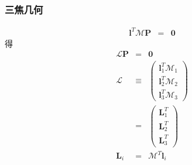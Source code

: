 \documentclass{beamer}
\newcommand{\tmmathbf}[1]{\ensuremath{\boldsymbol{#1}}}
\begin{document}
{{\begin{frame}
  {\hspace{4em}}
\end{frame}}{\begin{frame}
  \frametitle{三焦几何}
  \begin{eqnarray*}
    \tmmathbf{l}^T \mathcal{M}\tmmathbf{P} & = & \tmmathbf{0}
  \end{eqnarray*}
  得
  \begin{eqnarray*}
    \mathcal{L}\tmmathbf{P} & = & \tmmathbf{0}\\
    \mathcal{L} & \equiv & \left(\begin{array}{c}
      \tmmathbf{l}_1^T \mathcal{M}_1\\
      \tmmathbf{l}_2^T \mathcal{M}_2\\
      \tmmathbf{l}_3^T \mathcal{M}_3
    \end{array}\right)\\
    & = & \left(\begin{array}{c}
      \tmmathbf{L}_1^T\\
      \tmmathbf{L}_2^T\\
      \tmmathbf{L}_3^T
    \end{array}\right)\\
    \tmmathbf{L}_i & = & \mathcal{M}^T \tmmathbf{l}_i
  \end{eqnarray*}
\end{frame}}{\begin{frame}

\end{frame}}}
\end{document}
